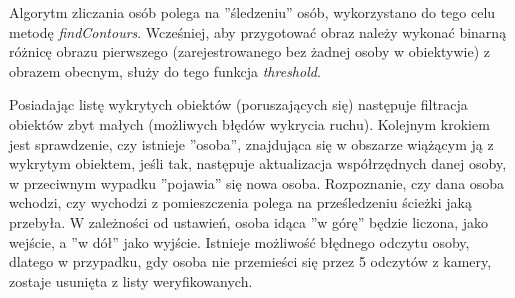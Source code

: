 	Algorytm zliczania osób polega na ''śledzeniu'' osób, wykorzystano do tego celu metodę \textit{findContours}. Wcześniej, aby przygotować obraz należy wykonać binarną różnicę obrazu pierwszego (zarejestrowanego bez żadnej osoby w obiektywie) z obrazem obecnym, służy do tego funkcja \textit{threshold}. 
	
	Posiadając listę wykrytych obiektów (poruszających się) następuje filtracja obiektów zbyt małych (możliwych błędów wykrycia ruchu). Kolejnym krokiem jest sprawdzenie, czy istnieje ''osoba'', znajdująca się w obszarze wiążącym ją z wykrytym obiektem, jeśli tak, następuje aktualizacja współrzędnych danej osoby, w przeciwnym wypadku ''pojawia'' się nowa osoba. Rozpoznanie, czy dana osoba wchodzi, czy wychodzi z pomieszczenia polega na prześledzeniu ścieżki jaką przebyła. W zależności od ustawień, osoba idąca ''w górę'' będzie liczona, jako wejście, a ''w dół'' jako wyjście. Istnieje możliwość błędnego odczytu osoby, dlatego w przypadku, gdy osoba nie przemieści się przez 5 odczytów z kamery, zostaje usunięta z listy weryfikowanych. \cite{rozpoznawanie_twarzy}